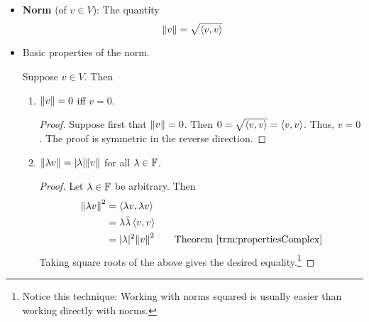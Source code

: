 \documentclass[../main.tex]{subfiles}
\begin{document}
\begin{itemize}
\begin{theorem}
\begin{enumerate}[label={\textup{(}\alph*\textup{)}},ref={\thetheorem\alph*}]
\begin{proof}
\begin{align*}
                    \inp{u}{\lambda v} &= \overline{\inp{\lambda v}{u}}\\
                    &= \overline{\lambda\inp{v}{u}}\\
                    &= \bar{\lambda}\overline{\inp{v}{u}}\tag*{Theorem \ref{trm:propertiesComplex}}\\
                    &= \bar{\lambda}\inp{u}{v}
                \end{align*}
            \end{proof}
        \end{enumerate}
    \end{theorem}
    \item \textbf{Norm} (of $v\in V$): The quantity
    \begin{equation*}
        \norm{v} = \sqrt{\left\langle{v},{v}\right\rangle}
    \end{equation*}
    \item Basic properties of the norm.
    \begin{theorem}\label{trm:normProperties}
        Suppose $v\in V$. Then
        \begin{enumerate}[label={\textup{(}\alph*\textup{)}},ref={\thetheorem\alph*}]
            \item \label{trm:normPropertiesa}$\norm{v}=0$ iff $v=0$.
            \begin{proof}
                Suppose first that $\norm{v}=0$. Then $0=\sqrt{\left\langle{v},{v}\right\rangle}=\left\langle{v},{v}\right\rangle$. Thus, $v=0$. The proof is symmetric in the reverse direction.
            \end{proof}
            \item \label{trm:normPropertiesb}$\norm{\lambda v}=|\lambda|\norm{v}$ for all $\lambda\in\mathbb{F}$.
            \begin{proof}
                Let $\lambda\in\mathbb{F}$ be arbitrary. Then
                \begin{align*}
                    \norm{\lambda v}^2 &= \inp{\lambda v}{\lambda v}\\
                    &= \lambda\bar{\lambda}\inp{v}{v}\\
                    &= |\lambda|^2\norm{v}^2\tag*{Theorem \ref{trm:propertiesComplex}}
                \end{align*}
                Taking square roots of the above gives the desired equality.\footnote{Notice this technique: Working with norms squared is usually easier than working directly with norms.}
            \end{proof}
        \end{enumerate}

\end{theorem}
\end{itemize}
\end{document}
